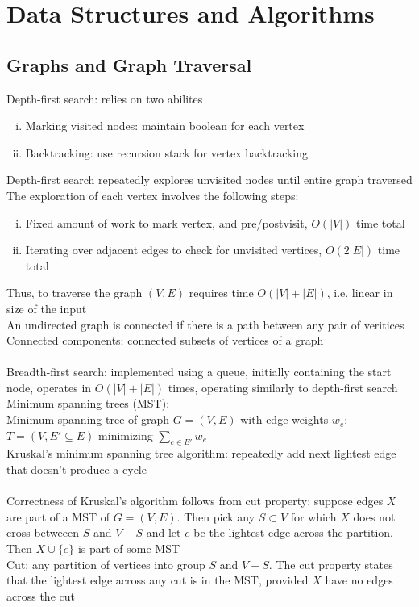 \documentclass{article}
\begin{document}
	\section{Data Structures and Algorithms}
		\subsection{Graphs and Graph Traversal}
			Depth-first search: relies on two abilites
			\begin{enumerate}[(i)]
				\item Marking visited nodes: maintain boolean for each vertex
				\item Backtracking: use recursion stack for vertex backtracking
				\end{enumerate}
			Depth-first search repeatedly explores unvisited nodes until entire graph traversed \\
			The exploration of each vertex involves the following steps:
			\begin{enumerate}[(i)]
				\item Fixed amount of work to mark vertex, and pre/postvisit, $O(|V|)$ time total
				\item Iterating over adjacent edges to check for unvisited vertices, $O(2|E|)$ time total
				\end{enumerate}
			Thus, to traverse the graph $(V, E)$ requires time $O(|V| + |E|)$, i.e. linear in size of the input \\
			An undirected graph is connected if there is a path between any pair of veritices \\
			Connected components: connected subsets of vertices of a graph \\
			\\
			Breadth-first search: implemented using a queue, initially containing the start node, operates in $O(|V| + |E|)$ times, operating similarly to depth-first search
			\\
			Minimum spanning trees (MST): \\
			Minimum spanning tree of graph $G = (V, E)$ with edge weights $w_e$: $T = (V, E' \subseteq E)$ minimizing $\sum_{e \in E'}w_e$ \\
			Kruskal's minimum spanning tree algorithm: repeatedly add next lightest edge that doesn't produce a cycle \\
			\\
			Correctness of Kruskal's algorithm follows from cut property: suppose edges $X$ are part of a MST of $G = (V, E)$. Then pick any $S \subset V$ for which $X$ does not cross betweeen $S$ and $V - S$ and let $e$ be the lightest edge across the partition. Then $X \cup \{e\}$ is part of some MST \\
			Cut: any partition of vertices into group $S$ and $V - S$. The cut property states that the lightest edge across any cut is in the MST, provided $X$ have no edges across the cut 
\end{document}
